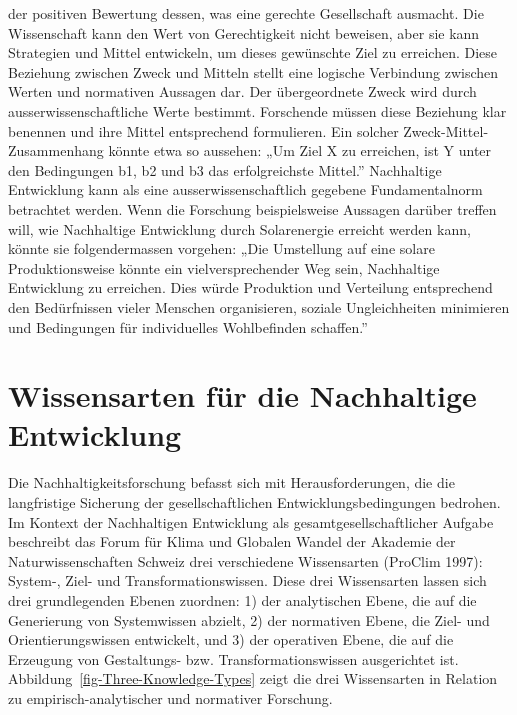 \documentclass[
  nswissgerman,
  a4paper,
  openany]{book}
\begin{document}
\begin{itemize}
  der positiven Bewertung dessen, was eine gerechte Gesellschaft
  ausmacht. Die Wissenschaft kann den Wert von Gerechtigkeit nicht
  beweisen, aber sie kann Strategien und Mittel entwickeln, um dieses
  gewünschte Ziel zu erreichen. Diese Beziehung zwischen Zweck und
  Mitteln stellt eine logische Verbindung zwischen Werten und normativen
  Aussagen dar. Der übergeordnete Zweck wird durch
  ausserwissenschaftliche Werte bestimmt. Forschende müssen diese
  Beziehung klar benennen und ihre Mittel entsprechend formulieren. Ein
  solcher Zweck-Mittel-Zusammenhang könnte etwa so aussehen: „Um Ziel X
  zu erreichen, ist Y unter den Bedingungen b1, b2 und b3 das
  erfolgreichste Mittel.'' Nachhaltige Entwicklung kann als eine
  ausserwissenschaftlich gegebene Fundamentalnorm betrachtet werden.
  Wenn die Forschung beispielsweise Aussagen darüber treffen will, wie
  Nachhaltige Entwicklung durch Solarenergie erreicht werden kann,
  könnte sie folgendermassen vorgehen: „Die Umstellung auf eine solare
  Produktionsweise könnte ein vielversprechender Weg sein, Nachhaltige
  Entwicklung zu erreichen. Dies würde Produktion und Verteilung
  entsprechend den Bedürfnissen vieler Menschen organisieren, soziale
  Ungleichheiten minimieren und Bedingungen für individuelles
  Wohlbefinden schaffen.''
\end{itemize}

\section{Wissensarten für die Nachhaltige
Entwicklung}\label{wissensarten-fuxfcr-die-nachhaltige-entwicklung}

Die Nachhaltigkeitsforschung befasst sich mit Herausforderungen, die die
langfristige Sicherung der gesellschaftlichen Entwicklungsbedingungen
bedrohen. Im Kontext der Nachhaltigen Entwicklung als
gesamtgesellschaftlicher Aufgabe beschreibt das Forum für Klima und
Globalen Wandel der Akademie der Naturwissenschaften Schweiz drei
verschiedene Wissensarten (ProClim 1997): System-, Ziel- und
Transformationswissen. Diese drei Wissensarten lassen sich drei
grundlegenden Ebenen zuordnen: 1) der analytischen Ebene, die auf die
Generierung von Systemwissen abzielt, 2) der normativen Ebene, die Ziel-
und Orientierungswissen entwickelt, und 3) der operativen Ebene, die auf
die Erzeugung von Gestaltungs- bzw. Transformationswissen ausgerichtet
ist. Abbildung~\ref{fig-Three-Knowledge-Types} zeigt die drei
Wissensarten in Relation zu empirisch-analytischer und normativer
Forschung.
\end{document}
